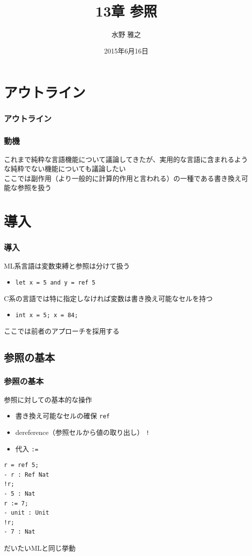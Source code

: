 \documentclass[dvipdfmx,cjk,xcolor=dvipsnames,envcountsect,notheorems]{beamer}
\title{13章 参照}
\author{水野 雅之}
\date{2015年6月16日}
\theoremstyle{definition}
\begin{document}
\frame[plain]{\titlepage}

\section*{アウトライン}

\begin{frame}
	\frametitle{アウトライン}
	\tableofcontents[sectionstyle=show,subsectionstyle=hide]
\end{frame}

\begin{frame}
	\frametitle{動機}
	\Large これまで純粋な言語機能について議論してきたが、実用的な言語に含まれるような純粋でない機能についても議論したい\\
	\vfill
	ここでは副作用（より一般的に計算的作用と言われる）の一種である書き換え可能な参照を扱う
\end{frame}

\section{導入}

\begin{frame}
	\frametitle{導入}
	\Large ML系言語は変数束縛と参照は分けて扱う
	\begin{itemize}
		\item \lstinline|let x = 5 and y = ref 5|
	\end{itemize}
	C系の言語では{\small 特に指定しなければ}変数は書き換え可能なセルを持つ
	\begin{itemize}
		\item \lstinline|int x = 5; x = 84;|
	\end{itemize}
	\vfill
	ここでは前者のアプローチを採用する
\end{frame}

\subsection{参照の基本}

\begin{frame}[fragile]
	\frametitle{参照の基本}
	\Large 参照に対しての基本的な操作
	\begin{itemize}
		\item 書き換え可能なセルの確保 \lstinline|ref|
		\item dereference（参照セルから値の取り出し） \lstinline|!|
		\item 代入 \lstinline|:=|
	\end{itemize}
\begin{lstlisting}
r = ref 5;
- r : Ref Nat
!r;
- 5 : Nat
r := 7;
- unit : Unit
!r;
- 7 : Nat
\end{lstlisting}
	だいたいMLと同じ挙動
\end{frame}
\end{document}
